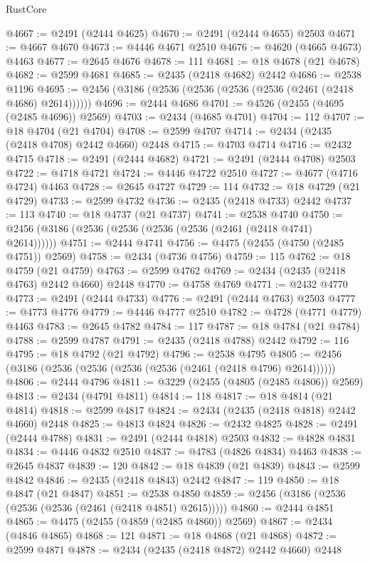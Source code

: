 \begin{lexlean}{RustCore}
\begin{coremodule}
@4667 := @2491 (@2444 @4625)
@4670 := @2491 (@2444 @4655) @2503
@4671 := @4667 @4670
@4673 := @4446 @4671 @2510
@4676 := @4620 (@4665 @4673) @4463
@4677 := @2645 @4676
@4678 := 111
@4681 := @18 @4678 (@21 @4678)
@4682 := @2599 @4681
@4685 := @2435 (@2418 @4682) @2442
@4686 := @2538 @1196
@4695 := @2456 (@3186 (@2536 (@2536 (@2536 (@2536 (@2461 (@2418 @4686) @2614))))))
@4696 := @2444 @4686
@4701 := @4526 (@2455 (@4695 (@2485 @4696)) @2569)
@4703 := @2434 (@4685 @4701)
@4704 := 112
@4707 := @18 @4704 (@21 @4704)
@4708 := @2599 @4707
@4714 := @2434 (@2435 (@2418 @4708) @2442 @4660) @2448
@4715 := @4703 @4714
@4716 := @2432 @4715
@4718 := @2491 (@2444 @4682)
@4721 := @2491 (@2444 @4708) @2503
@4722 := @4718 @4721
@4724 := @4446 @4722 @2510
@4727 := @4677 (@4716 @4724) @4463
@4728 := @2645 @4727
@4729 := 114
@4732 := @18 @4729 (@21 @4729)
@4733 := @2599 @4732
@4736 := @2435 (@2418 @4733) @2442
@4737 := 113
@4740 := @18 @4737 (@21 @4737)
@4741 := @2538 @4740
@4750 := @2456 (@3186 (@2536 (@2536 (@2536 (@2536 (@2461 (@2418 @4741) @2614))))))
@4751 := @2444 @4741
@4756 := @4475 (@2455 (@4750 (@2485 @4751)) @2569)
@4758 := @2434 (@4736 @4756)
@4759 := 115
@4762 := @18 @4759 (@21 @4759)
@4763 := @2599 @4762
@4769 := @2434 (@2435 (@2418 @4763) @2442 @4660) @2448
@4770 := @4758 @4769
@4771 := @2432 @4770
@4773 := @2491 (@2444 @4733)
@4776 := @2491 (@2444 @4763) @2503
@4777 := @4773 @4776
@4779 := @4446 @4777 @2510
@4782 := @4728 (@4771 @4779) @4463
@4783 := @2645 @4782
@4784 := 117
@4787 := @18 @4784 (@21 @4784)
@4788 := @2599 @4787
@4791 := @2435 (@2418 @4788) @2442
@4792 := 116
@4795 := @18 @4792 (@21 @4792)
@4796 := @2538 @4795
@4805 := @2456 (@3186 (@2536 (@2536 (@2536 (@2536 (@2461 (@2418 @4796) @2614))))))
@4806 := @2444 @4796
@4811 := @3229 (@2455 (@4805 (@2485 @4806)) @2569)
@4813 := @2434 (@4791 @4811)
@4814 := 118
@4817 := @18 @4814 (@21 @4814)
@4818 := @2599 @4817
@4824 := @2434 (@2435 (@2418 @4818) @2442 @4660) @2448
@4825 := @4813 @4824
@4826 := @2432 @4825
@4828 := @2491 (@2444 @4788)
@4831 := @2491 (@2444 @4818) @2503
@4832 := @4828 @4831
@4834 := @4446 @4832 @2510
@4837 := @4783 (@4826 @4834) @4463
@4838 := @2645 @4837
@4839 := 120
@4842 := @18 @4839 (@21 @4839)
@4843 := @2599 @4842
@4846 := @2435 (@2418 @4843) @2442
@4847 := 119
@4850 := @18 @4847 (@21 @4847)
@4851 := @2538 @4850
@4859 := @2456 (@3186 (@2536 (@2536 (@2536 (@2461 (@2418 @4851) @2615)))))
@4860 := @2444 @4851
@4865 := @4475 (@2455 (@4859 (@2485 @4860)) @2569)
@4867 := @2434 (@4846 @4865)
@4868 := 121
@4871 := @18 @4868 (@21 @4868)
@4872 := @2599 @4871
@4878 := @2434 (@2435 (@2418 @4872) @2442 @4660) @2448

\end{coremodule}
\end{lexlean}
